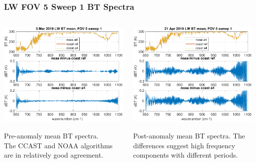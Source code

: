 \documentclass[10pt]{beamer}
\begin{document}
\begin{frame}
\frametitle{LW FOV 5 Sweep 1 BT Spectra}
\begin{columns}[t]
\begin{column}{0.5\textwidth}
  \begin{centering}
  \includegraphics[width=\textwidth]{figures/LW_pre_fail_BT_fov5_sd1.pdf}
  \end{centering}\vspace{3mm}
  Pre-anomaly mean BT spectra.  \\The CCAST and NOAA algorithms are
  in relatively good agreement.

\end{column}
\begin{column}{0.5\textwidth}  
  \begin{centering}
  \includegraphics[width=\textwidth]{figures/LW_post_fail_BT_fov5_sd1.pdf}
  \end{centering}\vspace{3mm}
  Post-anomaly mean BT spectra.  The differences suggest high
  frequency components with different periods.

\end{column}
\end{columns}
\end{frame}
\end{document}
